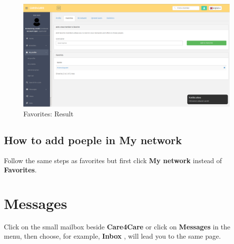 \documentclass{article}
\begin{document}
\begin{figure}[!ht]
   \includegraphics[width=\textwidth]{img/fav4.png}
   \caption{Favorites: Result}
\end{figure}
\subsection{How to add poeple in My network}
Follow the same steps as favorites but first click \textbf{My network} instead of \textbf{Favorites}.

\clearpage
\section{Messages}
Click on the small mailbox beside \textbf{Care4Care} or click on \textbf{Messages} in the menu, then choose, for example, \textbf{Inbox} , will lead you to the same page. 
\end{document}
